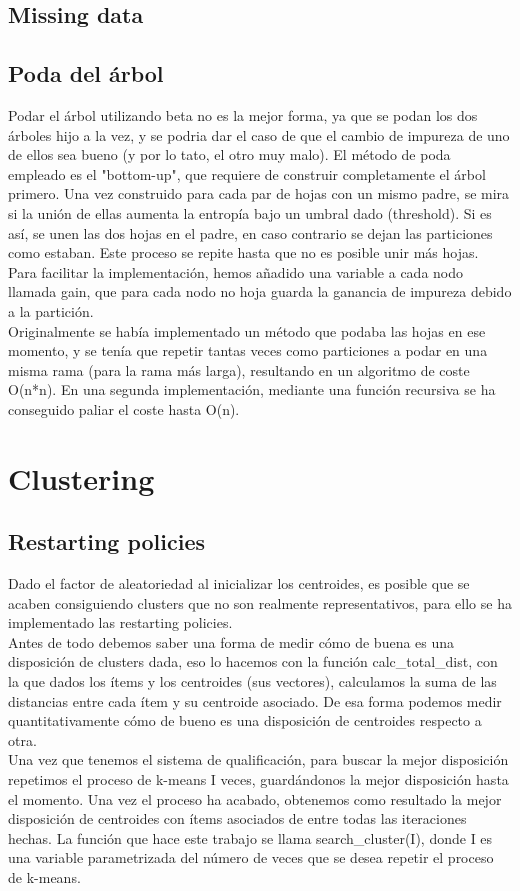\documentclass{article}
\begin{document}
\subsection{Missing data}
\subsection{Poda del árbol}
Podar el árbol utilizando beta no es la mejor
forma, ya que se podan los dos árboles hijo a la vez,
y se podria dar el caso de que el cambio de impureza de 
uno de ellos sea bueno (y por lo tato, el otro muy malo).
El método de poda empleado es el "bottom-up", que 
requiere de construir completamente el árbol primero.
Una vez construido para cada par de hojas con un mismo
padre, se mira si la unión de ellas aumenta la entropía
bajo un umbral dado (threshold). Si es así, se unen las 
dos hojas en el padre, en caso contrario se dejan las particiones
como estaban. Este proceso se repite hasta que no es posible
unir más hojas.\\
Para facilitar la implementación, hemos añadido una variable
a cada nodo llamada gain, que para cada nodo no hoja guarda 
la ganancia de impureza debido a la partición.\\ 
Originalmente se había implementado un método que podaba las hojas
en ese momento, y se tenía que repetir tantas veces como particiones 
a podar en una misma rama (para la rama más larga), resultando en un 
algoritmo de coste O(n*n).
En una segunda implementación, mediante una función recursiva se ha 
conseguido paliar el coste hasta O(n).

\section{Clustering}
\subsection{Restarting policies}
Dado el factor de aleatoriedad al inicializar los centroides,
es posible que se acaben consiguiendo clusters que no son 
realmente representativos, para ello se ha implementado las
restarting policies.\\
Antes de todo debemos saber una forma de medir cómo de buena
es una disposición de clusters dada, eso lo hacemos con la
función calc\_total\_dist, con la que dados los ítems y los 
centroides (sus vectores), calculamos la suma de las distancias
entre cada ítem y su centroide asociado. De esa forma podemos medir
quantitativamente cómo de bueno es una disposición de centroides 
respecto a otra.\\
Una vez que tenemos el sistema de qualificación, para buscar la mejor
disposición repetimos el proceso de k-means I veces, guardándonos
la mejor disposición hasta el momento. Una vez el proceso ha acabado,
obtenemos como resultado la mejor disposición de centroides con ítems
asociados de entre todas las iteraciones hechas. La función que hace este
trabajo se llama search\_cluster(I), donde I es una variable parametrizada 
del número de veces que se desea repetir el proceso de k-means. 
\end{document}
